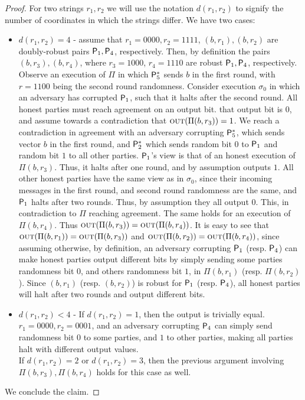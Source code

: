 
\begin{proof}
	For two strings $r_1,r_2$ we will use the notation $d(r_1,r_2)$ to signify the number of coordinates in which the strings differ. We have two cases:
	\begin{itemize}
		\item $d(r_1,r_2) = 4$ - \Wlg assume that $r_1 = 0000, r_2 = 1111$, $(b,r_1), (b,r_2)$ are doubly-robust pairs \wrt $\mathsf{P}_1,\mathsf{P}_4$, respectively. Then, by definition the pairs $(b,r_3), (b,r_4)$, where $r_3 = 1000$, $r_4 = 1110$ are robust \wrt $\mathsf{P}_1,\mathsf{P}_4$, respectively. Observe an execution of $\Pi$ in which $\mathsf{P}_5^\ast$ sends $b$ in the first round, with $r = 1100$ being the second round randomness. Consider execution $\sigma_0$ in which an adversary has corrupted $\mathsf{P}_1$, such that it halts after the second round. All honest parties must reach agreement on an output bit. \Wlg that output bit is $0$, and assume towards a contradiction that $\textsc{out}(\Pi(b,r_3)) = 1$. We reach a contradiction in agreement with an adversary corrupting $\mathsf{P}_5^\ast$, which sends vector $b$ in the first round, and $\mathsf{P}_2^\ast$ which sends random bit $0$ to $\mathsf{P}_1$ and random bit $1$ to all other parties. $\mathsf{P}_1$'s view is that of an honest execution of $\Pi(b,r_3)$. Thus, it halts after one round, and by assumption outputs $1$. All other honest parties have the same view as in $\sigma_0$, since their incoming messages in the first round, and second round randomness are the same, and $\mathsf{P}_1$ halts after two rounds. Thus, by assumption they all output $0$. This, in contradiction to $\Pi$ reaching agreement. The same holds for an execution of $\Pi(b,r_4)$. Thus $\textsc{out}(\Pi(b,r_3)) = \textsc{out}(\Pi(b,r_4))$. It is easy to see that $\textsc{out}(\Pi(b,r_1)) = \textsc{out}(\Pi(b,r_3))$ and $\textsc{out}(\Pi(b,r_2)) = \textsc{out}(\Pi(b,r_4))$, since assuming otherwise, by definition, an adversary corrupting $\mathsf{P}_1$ (resp. $\mathsf{P}_4$) can make honest parties output different bits by simply sending some parties randomness bit $0$, and others randomness bit $1$, in $\Pi(b,r_1)$ (resp. $\Pi(b,r_2)$). Since $(b,r_1)$ (resp. $(b,r_2)$) is robust for $\mathsf{P}_1$ (resp. $\mathsf{P}_4$), all honest parties will halt after two rounds and output different bits.
		
		\item $d(r_1,r_2) < 4$ - If  $d(r_1,r_2) = 1$, then the output is trivially equal. \Wlg $r_1 = 0000, r_2 = 0001$, and an adversary corrupting $\mathsf{P}_4$ can simply send randomness bit $0$ to some parties, and $1$ to other parties, making all parties halt with different output values. \\
		If $d(r_1,r_2) = 2$ or $d(r_1,r_2) = 3$, then the previous argument involving $\Pi(b,r_3), \Pi(b,r_4)$ holds for this case as well.
	\end{itemize}
	We conclude the claim.
\end{proof}

